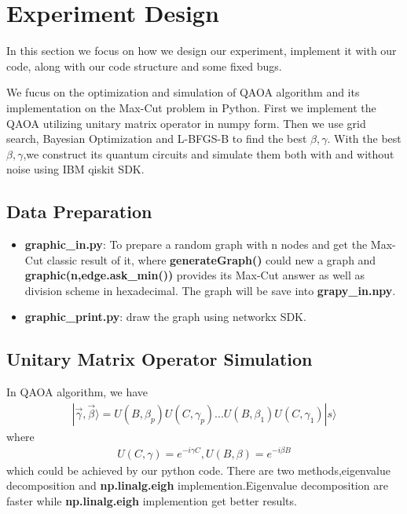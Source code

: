 \section{Experiment Design}
In this section we focus on how we design our experiment, implement it with our code, along with our code structure and some fixed bugs.

We fucus on the optimization and simulation of QAOA algorithm and its implementation on the Max-Cut problem in Python. First we implement the QAOA utilizing unitary matrix operator in numpy form. Then we use grid search, Bayesian Optimization and L-BFGS-B to find the best $\beta,\gamma$. With the best  $\beta,\gamma$,we construct its quantum circuits and simulate them both with and without noise using IBM qiskit SDK\cite{Qiskit}. 

\subsection{Data Preparation}
\begin{itemize}
    \item \textbf{graphic\_in.py}: To prepare a random graph with n nodes and get the Max-Cut classic result of it, where \textbf{generateGraph()}  could new a graph and \textbf{graphic(n,edge.ask\_min())} provides its Max-Cut answer as well as division scheme in hexadecimal. The graph will be save into \textbf{grapy\_in.npy}. 
    \item \textbf{graphic\_print.py}: draw the graph using networkx SDK.
\end{itemize}

\subsection{Unitary Matrix Operator Simulation}
In QAOA algorithm, we have 
\begin{align*}
    |\vec{\gamma}, \vec{\beta}\rangle=U(B,\beta_p)U(C,\gamma_p)...U(B,\beta_1)U(C,\gamma_1)|s\rangle 
\end{align*}
where 
\begin{align*}
    U(C, \gamma)=e^{-i\gamma C},U(B, \beta)=e^{-i\beta B}
\end{align*}
which could be achieved by our python code. There are two methods,eigenvalue decomposition and \textbf{np.linalg.eigh} implemention.Eigenvalue decomposition are faster while \textbf{np.linalg.eigh} implemention get better results.


